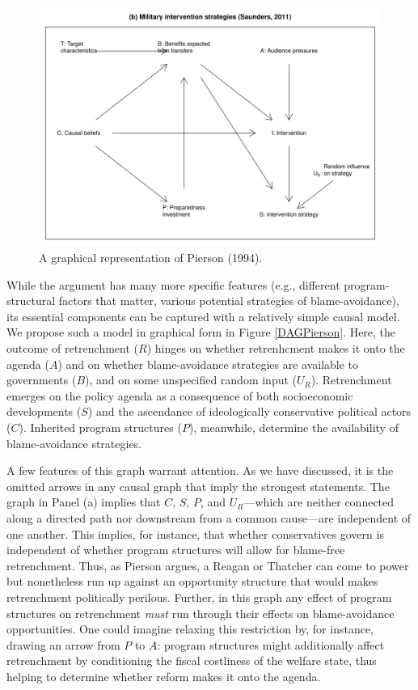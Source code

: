\documentclass[12pt,]{book}
\begin{document}
\begin{figure}

{\centering \includegraphics[width=.7\textwidth]{ii_files/figure-latex/unnamed-chunk-8-1} 

}

\caption{\label{fig:DAGPierson} A graphical representation of Pierson (1994).}\label{fig:unnamed-chunk-8}
\end{figure}

While the argument has many more specific features (e.g., different program-structural factors that matter, various potential strategies of blame-avoidance), its essential components can be captured with a relatively simple causal model. We propose such a model in graphical form in Figure \ref{DAGPierson}. Here, the outcome of retrenchment (\(R\)) hinges on whether retrenhcment makes it onto the agenda (\(A\)) and on whether blame-avoidance strategies are available to governments (\(B\)), and on some unspecified random input (\(U_R\)). Retrenchment emerges on the policy agenda as a consequence of both socioeconomic developments (\(S\)) and the ascendance of ideologically conservative political actors (\(C\)). Inherited program structures (\(P\)), meanwhile, determine the availability of blame-avoidance strategies.

A few features of this graph warrant attention. As we have discussed, it is the omitted arrows in any causal graph that imply the strongest statements. The graph in Panel (a) implies that \(C\), \(S\), \(P\), and \(U_R\)---which are neither connected along a directed path nor downstream from a common cause---are independent of one another. This implies, for instance, that whether conservatives govern is independent of whether program structures will allow for blame-free retrenchment. Thus, as Pierson argues, a Reagan or Thatcher can come to power but nonetheless run up against an opportunity structure that would makes retrenchment politically perilous. Further, in this graph any effect of program structures on retrenchment \emph{must} run through their effects on blame-avoidance opportunities. One could imagine relaxing this restriction by, for instance, drawing an arrow from \(P\) to \(A\): program structures might additionally affect retrenchment by conditioning the fiscal costliness of the welfare state, thus helping to determine whether reform makes it onto the agenda.
\end{document}
